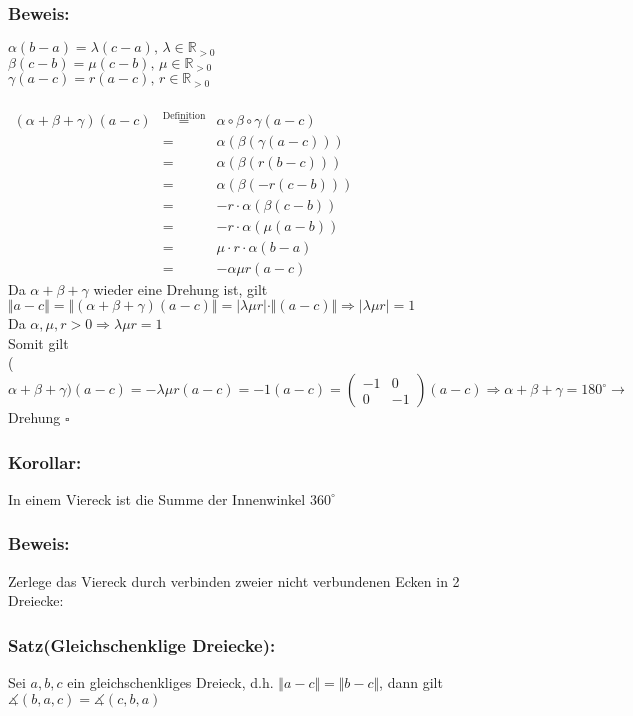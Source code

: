 \subsubsection{Beweis:}
$\alpha(b-a)=\lambda(c-a), \, \lambda \in \mathbb{R}_{>0}$\\
$\beta(c-b)=\mu(c-b), \, \mu \in \mathbb{R}_{>0}$\\
$\gamma(a-c)= r(a-c), \, r \in \mathbb{R}_{>0}$\\
\qquad\\
$
\begin{array}{rcr}
(\alpha + \beta + \gamma)(a-c) &\mathop{=}\limits^{\text{Definition}}& \alpha \circ \beta \circ \gamma(a-c)\\
 &=&  \alpha (\beta(\gamma(a-c)))\\
 &=& \alpha(\beta(r(b-c)))\\
 &=& \alpha (\beta(-r(c-b)))\\
 &=& -r \cdot \alpha(\beta(c-b))\\
 &=& -r\cdot \alpha(\mu(a-b))\\
 &=& \mu \cdot r \cdot \alpha (b-a)\\
 &=& -\alpha \mu r (a-c)
\end{array} 
$\\
Da $\alpha + \beta + \gamma$ wieder eine Drehung ist, gilt $\Vert a-c\Vert = \Vert (\alpha + \beta + \gamma)(a-c)\Vert=\vert\lambda \mu r\vert \cdot \Vert (a-c)\Vert \Rightarrow \vert \lambda \mu r\vert=1$\\
Da $\alpha, \mu, r > 0 \Rightarrow \lambda\mu r = 1$\\
Somit gilt \\
($\alpha+\beta+\gamma)(a-c)=-\lambda \mu r (a-c) = -1(a-c)=\begin{pmatrix} -1 & 0 \\ 0 & -1\end{pmatrix}(a-c) \Rightarrow \alpha + \beta + \gamma=180^{\circ} \rightarrow$ Drehung $\square$
%
%
%
\subsubsection{Korollar:}
In einem Viereck ist die Summe der Innenwinkel $360^{\circ}$
%
%
%
\subsubsection{Beweis:}
Zerlege das Viereck durch verbinden zweier nicht verbundenen Ecken in 2 Dreiecke:
%
%
%
%
\subsubsection{Satz(Gleichschenklige Dreiecke):}
Sei $a,b,c$ ein gleichschenkliges Dreieck, d.h. $\Vert a-c \Vert = \Vert b-c \Vert$, dann gilt $\measuredangle (b,a,c) = \measuredangle (c,b,a)$
%
%
%
%
